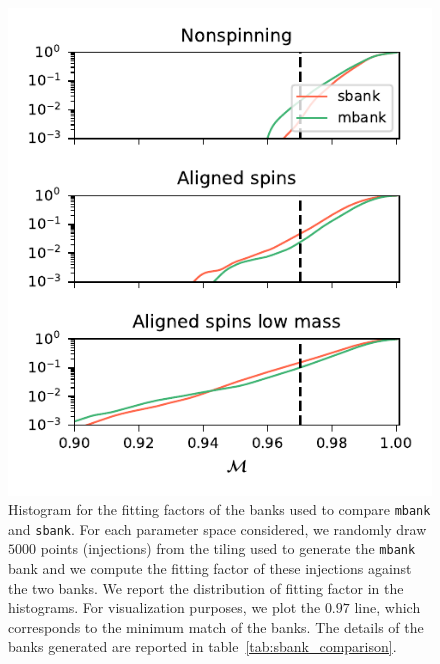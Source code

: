 \documentclass[twocolumn,showpacs,preprintnumbers,nofootinbib,prd,
superscriptaddress,10pt]{revtex4-2}
\begin{document}
\begin{figure}[t!]
	\includegraphics{sbank_comparison}
	\caption{Histogram for the fitting factors of the banks used to compare \texttt{mbank} and \texttt{sbank}. For each parameter space considered, we randomly draw $5000$ points (injections) from the tiling used to generate the \texttt{mbank} bank and we compute the fitting factor of these injections against the two banks. We report the distribution of fitting factor in the histograms. For visualization purposes, we plot the $0.97$ line, which corresponds to the minimum match of the banks.
	The details of the banks generated are reported in table~\ref{tab:sbank_comparison}.
	}
	\label{fig:sbank_comparison}
\end{figure}
\end{document}
